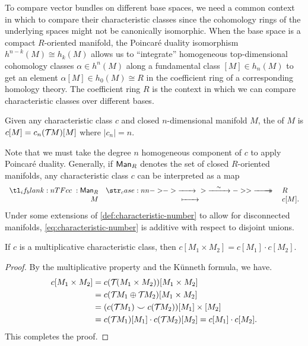 To compare vector bundles on different base spaces, we need a common context in which to compare their characteristic classes since the cohomology rings of the underlying spaces might not be canonically isomorphic. When the base space is a compact $R$-oriented manifold, the Poincar\'e duality isomorphism $h^{n-k}(M) \cong h_k(M)$ allows us to ``integrate'' homogeneous top-dimensional cohomology classes $\alpha\in h^{n}(M)$ along a fundamental class $[M]\in h_n(M)$ to get an element $\alpha[M]\in h_0(M)\cong R$ in the coefficient ring of a corresponding homology theory. The coefficient ring $R$ is the context in which we can compare characteristic classes over different bases.

\begin{definition}\label{def:characteristic-number}
	Given any characteristic class $c$ and closed $n$-dimensional manifold $M$, the  of $M$ is $c[M] = c_n({\mathcal{T}\hspace{-0.1em}} M)[M]$ where $|c_n|=n$.
\end{definition}

Note that we must take the degree $n$ homogeneous component of $c$ to apply Poincar\'e duality. Generally, if $\mathsf{Man}_R$ denotes the set of closed $R$-oriented manifolds, any characteristic class $c$ can be interpreted as a map
\begin{equation}\label{eq:characteristic-number}
	\lkxfunc{c}{\Man_R}{R}{M}{c[M].}
\end{equation}
Under some extensions of \cref{def:characteristic-number} to allow for disconnected manifolds, \cref{eq:characteristic-number} is additive with respect to disjoint unions.
\begin{proposition}
	If $c$ is a multiplicative characteristic class, then $c[M_1\times M_2]=c[M_1]\cdot c[M_2]$.
\end{proposition}
\begin{proof}
	By the multiplicative property and the K\"unneth formula, we have.
	\[
		\begin{aligned}
			c[M_1\times M_2]
			 & = c({\mathcal{T}\hspace{-0.1em}} (M_1\times M_2))[M_1\times M_2]                      \\
			 & = c({\mathcal{T}\hspace{-0.1em}} M_1\oplus {\mathcal{T}\hspace{-0.1em}} M_2)[M_1\times M_2]                    \\
			 & = (c({\mathcal{T}\hspace{-0.1em}} M_1)\smile c({\mathcal{T}\hspace{-0.1em}} M_2))[M_1]\times [M_2]             \\
			 & = c({\mathcal{T}\hspace{-0.1em}} M_1)[M_1]\cdot c({\mathcal{T}\hspace{-0.1em}} M_2)[M_2] = c[M_1]\cdot c[M_2].
		\end{aligned}
	\]
	This completes the proof.
\end{proof}


